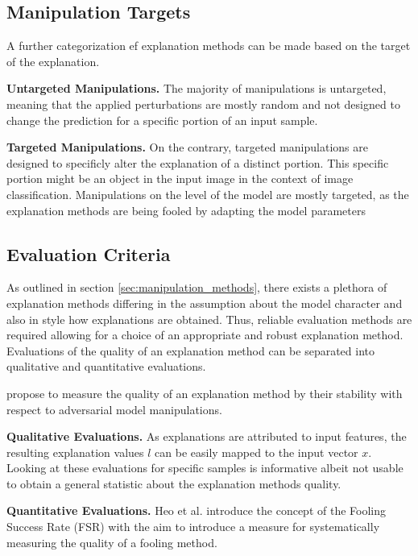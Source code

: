 \subsection{Manipulation Targets}
\label{subsec:manipulation_targets}
A further categorization ef explanation methods can be made based on the target of the explanation. 

\noindent\textbf{Untargeted Manipulations.} 
The majority of manipulations is untargeted, meaning that the applied perturbations are mostly random and not designed to change the prediction for a specific portion of an input sample. 

\noindent\textbf{Targeted Manipulations.} 
On the contrary, targeted manipulations are designed to specificly alter the explanation of a distinct portion. This specific portion might be an object in the input image in the context of image classification. 
Manipulations on the level of the model are mostly targeted, as the explanation methods are being fooled by adapting the model parameters 









\subsection{Evaluation Criteria}
\label{subsec:evaluation_criteria}
As outlined in section \autoref{sec:manipulation_methods}, there exists a plethora of explanation methods differing in the assumption about the model character and also in style how explanations are obtained. Thus, reliable evaluation methods are required allowing for a choice of an appropriate and robust explanation method. 
Evaluations of the quality of an explanation method can be separated into qualitative and quantitative evaluations. 

\cite{fooling_nn_interpreters} propose to measure the quality of an explanation method by their stability with respect to adversarial model manipulations. 





\noindent\textbf{Qualitative Evaluations.} 
As explanations are attributed to input features, the resulting explanation values $l$ can be easily mapped to the input vector $x$.
Looking at these evaluations for specific samples is informative albeit not usable to obtain a general statistic about the explanation methods quality.


\noindent\textbf{Quantitative Evaluations.} 
Heo et al. \cite{fooling_nn_interpreters} introduce the concept of the Fooling Success Rate (FSR) with the aim to introduce a measure for systematically measuring the quality of a fooling method. 
